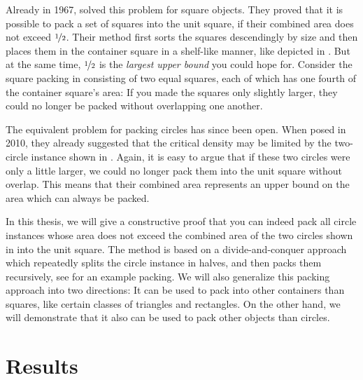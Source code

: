 \documentclass[a4paper,style=print,bibliography=totoc,nexus,lnum,extramargin]{tubsbook}
\begin{document}
Already in 1967, \textcite{MM1967some} solved this problem for square objects. They proved that it is possible to pack a set of squares into the unit square, if their combined area does not exceed $\nicefrac{1}{2}$. Their method first sorts the squares descendingly by size and then places them in the container square in a shelf-like manner, like depicted in . But at the same time, $\nicefrac{1}{2}$ is the \emph{largest upper bound} you could hope for. Consider the square packing in  consisting of two equal squares, each of which has one fourth of the container square's area: If you made the squares only slightly larger, they could no longer be packed without overlapping one another.


The equivalent problem for packing circles has since been open.
When \textcite{DFL2010circle} posed  in 2010, they already suggested that the critical density may be limited by the two-circle instance shown in . Again, it is easy to argue that if these two circles were only a little larger, we could no longer pack them into the unit square without overlap. This means that their combined area represents an upper bound on the area which can always be packed.


In this thesis, we will give a constructive proof that you can indeed pack all circle instances whose area does not exceed the combined area of the two circles shown in  into the unit square.
The method is based on a divide-and-conquer approach which repeatedly splits the circle instance in halves, and then packs them recursively,
see  for an example packing.
We will also generalize this packing approach into two directions: It can be used to pack into other containers than squares, like certain classes of triangles and rectangles. On the other hand, we will demonstrate that it also can be used to pack other objects than circles.

\section{Results}
\end{document}
